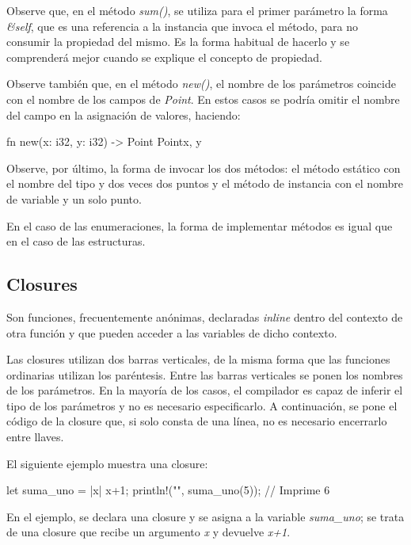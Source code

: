 Observe que, en el método \textit{sum()}, se utiliza para el primer parámetro la forma \textit{\&self}, que es una referencia a la instancia que invoca el método, para no consumir la propiedad del mismo. Es la forma habitual de hacerlo y se comprenderá mejor cuando se explique el concepto de propiedad.

Observe también que, en el método \textit{new()}, el nombre de los parámetros coincide con el nombre de los campos de \textit{Point}. En estos casos se podría omitir el nombre del campo en la asignación de valores, haciendo:

\vspace{0.7em}
\begin{Codigo}
fn new(x: i32, y: i32) -> Point {
   Point{x, y}
}
\end{Codigo}

Observe, por último, la forma de invocar los dos métodos: el método estático con el nombre del tipo y dos veces dos puntos y el método de instancia con el nombre de variable y un solo punto.

En el caso de las enumeraciones, la forma de implementar métodos es igual que en el caso de las estructuras.

\subsection{Closures}
Son funciones, frecuentemente anónimas, declaradas \textit{inline} dentro del contexto de otra función y que pueden acceder a las variables de dicho contexto.

Las closures utilizan dos barras verticales, de la misma forma que las funciones ordinarias utilizan los paréntesis. Entre las barras verticales se ponen los nombres de los parámetros. En la mayoría de los casos, el compilador es capaz de inferir el tipo de los parámetros y no es necesario especificarlo. A continuación, se pone el código de la closure que, si solo consta de una línea, no es necesario encerrarlo entre llaves.

El siguiente ejemplo muestra una closure:

\vspace{0.7em}
\begin{Codigo}
let suma_uno = |x| x+1;
println!("{}", suma_uno(5)); // Imprime 6
\end{Codigo}

En el ejemplo, se declara una closure y se asigna a la variable \textit{suma\_uno}; se trata de una closure que recibe un argumento \textit{x} y devuelve \textit{x+1}.


